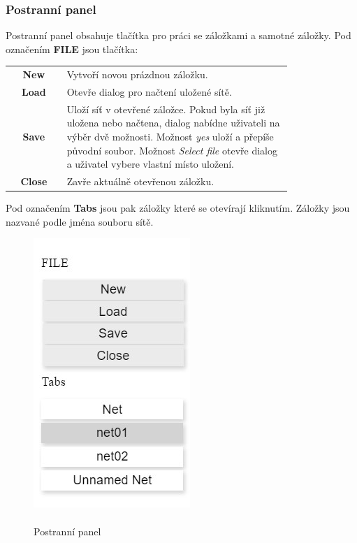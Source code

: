 \documentclass[
  biblatex,
  glossaries,
  printversion
]{kidiplom}
\begin{document}
\subsubsection{Postranní panel}\label{panel}

Postranní panel obsahuje tlačítka pro práci se záložkami a 
samotné záložky. Pod označením \textbf{FILE} jsou tlačítka:
\begin{center}
  \begin{tabular}{c p{0.8\linewidth}}
    \textbf{New}    & Vytvoří novou prázdnou záložku. \\
    \textbf{Load}   & Otevře dialog pro načtení uložené sítě. \\
    \textbf{Save}   & Uloží síť v otevřené záložce. Pokud byla síť již uložena 
      nebo načtena, dialog nabídne uživateli na výběr dvě možnosti.
      Možnost \textit{yes} uloží a přepíše původní soubor.
      Možnost \textit{Select file} otevře dialog 
      a uživatel vybere vlastní místo uložení. \\
    \textbf{Close}  & Zavře aktuálně otevřenou záložku. \\
  \end{tabular}
\end{center}

Pod označením \textbf{Tabs} jsou pak záložky které se otevírají kliknutím.
Záložky jsou nazvané podle jména souboru sítě.

\begin{figure}[h]
  \centering
  \includegraphics{editor_panel}
  \caption{\\Postranní panel}\label{fig:Postranní panel}
\end{figure}
\end{document}
